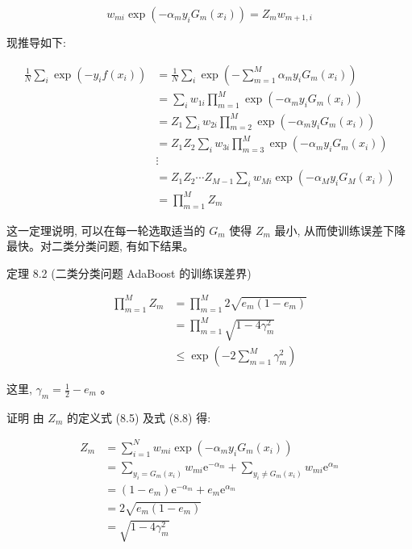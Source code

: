 \documentclass[10pt]{article}
\begin{document}
$$
w_{m i} \exp \left(-\alpha_{m} y_{i} G_{m}\left(x_{i}\right)\right)=Z_{m} w_{m+1, i}
$$

现推导如下:

$$
\begin{aligned}
\frac{1}{N} \sum_{i} \exp \left(-y_{i} f\left(x_{i}\right)\right) & =\frac{1}{N} \sum_{i} \exp \left(-\sum_{m=1}^{M} \alpha_{m} y_{i} G_{m}\left(x_{i}\right)\right) \\
& =\sum_{i} w_{1 i} \prod_{m=1}^{M} \exp \left(-\alpha_{m} y_{i} G_{m}\left(x_{i}\right)\right) \\
& =Z_{1} \sum_{i} w_{2 i} \prod_{m=2}^{M} \exp \left(-\alpha_{m} y_{i} G_{m}\left(x_{i}\right)\right) \\
& =Z_{1} Z_{2} \sum_{i} w_{3 i} \prod_{m=3}^{M} \exp \left(-\alpha_{m} y_{i} G_{m}\left(x_{i}\right)\right) \\
& \vdots \\
& =Z_{1} Z_{2} \cdots Z_{M-1} \sum_{i} w_{M i} \exp \left(-\alpha_{M} y_{i} G_{M}\left(x_{i}\right)\right) \\
& =\prod_{m=1}^{M} Z_{m}
\end{aligned}
$$

这一定理说明, 可以在每一轮选取适当的 $G_{m}$ 使得 $Z_{m}$ 最小, 从而使训练误差下降最快。对二类分类问题, 有如下结果。

定理 8.2 (二类分类问题 AdaBoost 的训练误差界)


\begin{align*}
\prod_{m=1}^{M} Z_{m} & =\prod_{m=1}^{M} 2 \sqrt{e_{m}\left(1-e_{m}\right)} \\
& =\prod_{m=1}^{M} \sqrt{1-4 \gamma_{m}^{2}} \\
& \leqslant \exp \left(-2 \sum_{m=1}^{M} \gamma_{m}^{2}\right) \tag{8.10}
\end{align*}


这里, $\gamma_{m}=\frac{1}{2}-e_{m}$ 。

证明 由 $Z_{m}$ 的定义式 (8.5) 及式 (8.8) 得:


\begin{align*}
Z_{m} & =\sum_{i=1}^{N} w_{m i} \exp \left(-\alpha_{m} y_{i} G_{m}\left(x_{i}\right)\right) \\
& =\sum_{y_{i}=G_{m}\left(x_{i}\right)} w_{m i} \mathrm{e}^{-\alpha_{m}}+\sum_{y_{i} \neq G_{m}\left(x_{i}\right)} w_{m i} \mathrm{e}^{\alpha_{m}} \\
& =\left(1-e_{m}\right) \mathrm{e}^{-\alpha_{m}}+e_{m} \mathrm{e}^{\alpha_{m}} \\
& =2 \sqrt{e_{m}\left(1-e_{m}\right)} \\
& =\sqrt{1-4 \gamma_{m}^{2}} \tag{8.11}
\end{align*}
\end{document}
